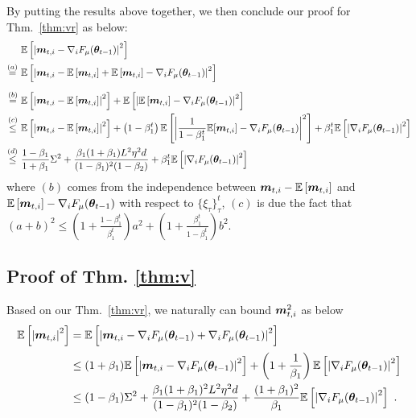 \begin{appendices}
By putting the results above together, we then conclude our proof for Thm.~\ref{thm:vr} as below:
\begin{equation}
\begin{aligned}
&\mathbb{E}\left[\left|{\bm{m}}_{t,i} - \nabla_i F_{\mu}({\bm{\theta}}_{t-1})\right|^2\right] \\
\stackrel{(a)}{=}\,\,& \mathbb{E}\left[\left|{\bm{m}}_{t,i} - \mathbb{E}\left[{\bm{m}}_{t,i}\right] + \mathbb{E}\left[{\bm{m}}_{t,i}\right] - \nabla_i F_{\mu}({\bm{\theta}}_{t-1})\right|^2\right] \\[5pt]
\stackrel{(b)}{=}\,\,& \mathbb{E}\left[\left|{\bm{m}}_{t,i} - \mathbb{E}\left[{\bm{m}}_{t,i}\right]\right|^2\right] + \mathbb{E}\left[\left|\mathbb{E}\left[{\bm{m}}_{t,i}\right] - \nabla_i F_{\mu}({\bm{\theta}}_{t-1})\right|^2\right] \\
\stackrel{(c)}{\leq}\,\,& \mathbb{E}\left[\left|{\bm{m}}_{t,i} - \mathbb{E}\left[{\bm{m}}_{t,i}\right]\right|^2\right] + \left(1-\beta_1^t\right)\mathbb{E}\left[\left|\frac{1}{1 - \beta_1^t}\mathbb{E}[{\bm{m}}_{t,i}] - \nabla_i F_{\mu}({\bm{\theta}}_{t-1})\right|^2\right] + \beta_1^{t}\mathbb{E}\left[\left|\nabla_i F_{\mu}({\bm{\theta}}_{t-1})\right|^2\right] \\
\stackrel{(d)}{\leq}\,\,& \frac{1-\beta_1}{1 + \beta_1} \Sigma^2 + \frac{\beta_1(1+\beta_1)L^2\eta^2 d}{(1 - \beta_1)^2(1 - \beta_2)} + \beta_1^{t}\mathbb{E}\left[\left|\nabla_i F_{\mu}({\bm{\theta}}_{t-1})\right|^2\right]
\end{aligned}
\end{equation}
where $(b)$ comes from the independence between ${\bm{m}}_{t,i} - \mathbb{E}\left[{\bm{m}}_{t,i}\right]$ and $\mathbb{E}\left[{\bm{m}}_{t,i}\right] - \nabla_i F_{\mu}({\bm{\theta}}_{t-1})$ with respect to $\{\xi_{\tau}\}_{\tau}^t$, $(c)$ is due the fact that $(a+b)^2 \leq \left(1 + \frac{1 - \beta_1^t}{\beta_1^t}\right)a^2 + \left(1 + \frac{\beta_1^t}{1-\beta_1^t}\right)b^2$.


\subsection{Proof of Thm. \ref{thm:v}}\label{proof:v}
Based on our Thm.~\ref{thm:vr}, we naturally can bound ${\bm{m}}_{t,i}^2$ as below
\begin{equation}
\begin{aligned}
\mathbb{E}\left[\left|{\bm{m}}_{t,i}\right|^2\right]& = \mathbb{E}\left[\left|{\bm{m}}_{t,i} -\nabla_i F_{\mu}({\bm{\theta}}_{t-1}) + \nabla_i F_{\mu}({\bm{\theta}}_{t-1})\right|^2\right] \\[2pt]
&\leq (1 + \beta_1)\mathbb{E}\left[\left|{\bm{m}}_{t,i} - \nabla_i F_{\mu}({\bm{\theta}}_{t-1})\right|^2\right] + \left(1 + \frac{1}{\beta_1}\right)\mathbb{E}\left[\left|\nabla_i F_{\mu}({\bm{\theta}}_{t-1})\right|^2\right] \\
&\leq (1-\beta_1) \Sigma^2 + \frac{\beta_1(1+\beta_1)^2L^2\eta^2 d}{(1 - \beta_1)^2(1 - \beta_2)} + \frac{(1+\beta_1)^2}{\beta_1} \mathbb{E}\left[\left|\nabla_i F_{\mu}({\bm{\theta}}_{t-1})\right|^2\right] \ . \label{eq:vjneb}
\end{aligned}
\end{equation}


\end{appendices}
